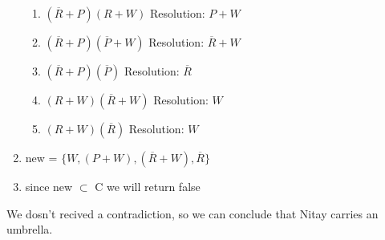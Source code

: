 \documentclass{article}
\begin{document}
\begin{enumerate}
\begin{enumerate}
        \item $(\overline R + P)(R + W)$ Resolution: $P+W $
        \item $(\overline R + P)(\overline P + W)$ Resolution: $\overline R +W $
        \item $(\overline R + P)(\overline P) $ Resolution: $\overline R$
        \item $(R+W)(\overline R + W)$ Resolution: $W$
        \item $(R+W)(\overline R)$ Resolution: $W$
    \end{enumerate}
    \item new = $\{W,(P+W),(\overline R + W),\overline R\}$
    \item since new $\subset$ C we will return false
\end{enumerate}
We dosn't recived a contradiction, so we can conclude that Nitay carries an umbrella.
\end{document}
